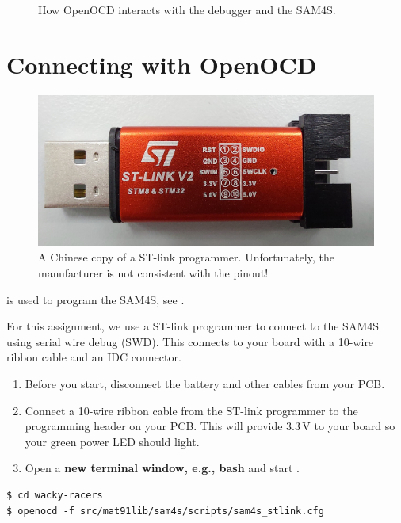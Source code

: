 \begin{figure}

\caption{How OpenOCD interacts with the debugger and the SAM4S.}
\label{fig:openocd diagram}
\end{figure}


\section{Connecting with OpenOCD}
\label{openocd}

\begin{figure}[!h]
  \centering \includegraphics[width=6in]{figs/stlink.jpg}
  \caption{A Chinese copy of a ST-link programmer.  Unfortunately, the
    manufacturer is not consistent with the pinout!}
  \label{fig:stlink}
\end{figure}


 is used to program the SAM4S, see .

For this assignment, we use a ST-link programmer to connect to the
SAM4S using serial wire debug (SWD). This connects to your board with
a 10-wire ribbon cable and an IDC connector.

\begin{enumerate}
\item
  Before you start, disconnect the battery and other cables from your
  PCB.
\item
  Connect a 10-wire ribbon cable from the ST-link programmer to the
  programming header on your PCB. This will provide 3.3\,V to your
  board so your green power LED should light.
\item
  Open a \textbf{new terminal window, e.g., bash} and
  start .
\end{enumerate}

\begin{verbatim}
$ cd wacky-racers
$ openocd -f src/mat91lib/sam4s/scripts/sam4s_stlink.cfg
\end{verbatim}

